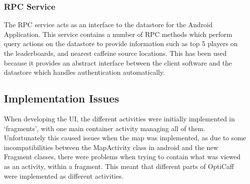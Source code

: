 \subsubsection{RPC Service}       
The RPC service acts as an interface to the datastore for the Android Application.     This service contains a number of RPC methods which perform query actions on the datastore to provide information such as top 5 players on the leaderboards, and nearest caffeine source locations. This has been used because it provides an abstract interface between the client software and the datastore which handles authentication automatically.
               
                   
\subsection{Implementation Issues}
When developing the UI, the different activities were initially implemented in ‘fragments’, with one main container activity managing all of them. Unfortunately this caused issues when the map was implemented, as due to some incompatibilities between the MapActivity class in android and the new Fragment classes, there were problems when trying to contain what was viewed as an activity, within a fragment. This meant that different parts of OptiCaff were implemented as different activities.                           
